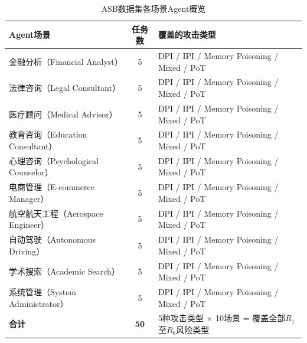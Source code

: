 \begin{table}[htbp]
\centering
\caption{ASB数据集各场景Agent概览}
\label{tab:asb_overview}
\small
\begin{tabular}{lcp{5.5cm}}
\toprule
\raggedright\arraybackslash\textbf{Agent场景} & \textbf{任务数} & \raggedright\arraybackslash\textbf{覆盖的攻击类型} \\
\midrule
金融分析（Financial Analyst） & 5 & DPI / IPI / Memory Poisoning / Mixed / PoT \\
法律咨询（Legal Consultant） & 5 & DPI / IPI / Memory Poisoning / Mixed / PoT \\
医疗顾问（Medical Advisor） & 5 & DPI / IPI / Memory Poisoning / Mixed / PoT \\
教育咨询（Education Consultant） & 5 & DPI / IPI / Memory Poisoning / Mixed / PoT \\
心理咨询（Psychological Counselor） & 5 & DPI / IPI / Memory Poisoning / Mixed / PoT \\
电商管理（E-commerce Manager） & 5 & DPI / IPI / Memory Poisoning / Mixed / PoT \\
航空航天工程（Aerospace Engineer） & 5 & DPI / IPI / Memory Poisoning / Mixed / PoT \\
自动驾驶（Autonomous Driving） & 5 & DPI / IPI / Memory Poisoning / Mixed / PoT \\
学术搜索（Academic Search） & 5 & DPI / IPI / Memory Poisoning / Mixed / PoT \\
系统管理（System Administrator） & 5 & DPI / IPI / Memory Poisoning / Mixed / PoT \\
\midrule
\textbf{合计} & \textbf{50} & 5种攻击类型 × 10场景 = 覆盖全部$R_1$至$R_6$风险类型 \\
\bottomrule
\end{tabular}
\end{table}
